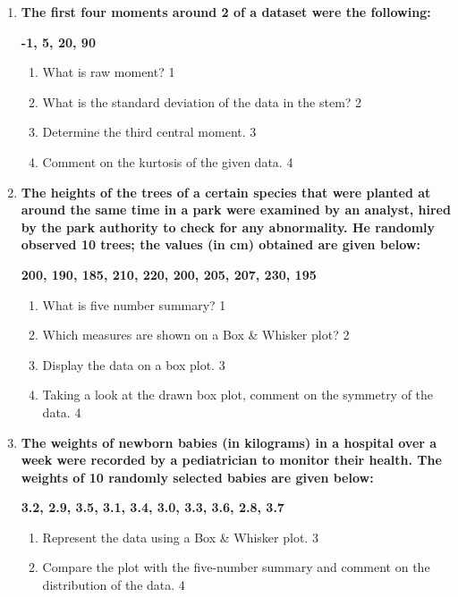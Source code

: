 \documentclass[a4paper,oneside]{book}
\begin{document}
\begin{enumerate}
   \item
	  \textbf{The first four moments around 2 of a dataset were the following:}
	  
	  \begin{center}
	  \textbf{-1, 5, 20, 90}
	  \end{center}
  
  \begin{enumerate}
    \item
	What is raw moment? \hfill 1
    \item
	What is the standard deviation of the data in the stem? \hfill 2
    \item  
	Determine the third central moment. \hfill 3
    \item
	Comment on the kurtosis of the given data. \hfill 4
  \end{enumerate}
  
     \item
	  \textbf{The heights of the trees of a certain species that were planted at around the same time in a park were examined by an analyst, hired by the park authority to check for any abnormality. He randomly observed 10 trees; the values (in cm) obtained are given below:} 
	  
	  	  \begin{center}
	  \textbf{200, 190, 185, 210, 220, 200, 205, 207, 230, 195}
	  \end{center}
  
  \begin{enumerate}
    \item
	What is five number summary? \hfill 1
    \item
	Which measures are shown on a Box \& Whisker plot? \hfill 2
    \item  
	Display the data on a box plot. \hfill 3
    \item
	Taking a look at the drawn box plot, comment on the symmetry of the data. \hfill 4
  \end{enumerate}
  
  \item
\textbf{The weights of newborn babies (in kilograms) in a hospital over a week were recorded by a pediatrician to monitor their health. The weights of 10 randomly selected babies are given below:}

\begin{center}
\textbf{3.2, 2.9, 3.5, 3.1, 3.4, 3.0, 3.3, 3.6, 2.8, 3.7}
\end{center}

\begin{enumerate}
    \item  
    Represent the data using a Box \& Whisker plot. \hfill 3
    \item
    Compare the plot with the five-number summary and comment on the distribution of the data. \hfill 4
\end{enumerate}


\end{enumerate}
\end{document}
